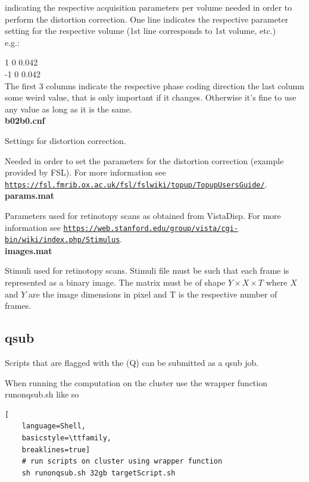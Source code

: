 \documentclass[12pt,a4paper]{scrartcl}
\begin{document}
\noindent indicating the respective acquisition parameters per volume needed in order to perform the distortion correction. One line indicates the respective parameter setting for the respective volume (1st line corresponds to 1st volume, etc.)\\

\noindent e.g.:

 1 0 0.042\\
 -1 0 0.042\\

The first 3 columns indicate the respective phase coding direction the last column some weird value, that is only important if it changes. Otherwise it's fine to use any value as long as it is the same.\\

\noindent\textbf{b02b0.cnf}

\noindent Settings for distortion correction.

Needed in order to set the parameters for the distortion correction (example provided by FSL). For more information see \href{https://fsl.fmrib.ox.ac.uk/fsl/fslwiki/topup/TopupUsersGuide/}{\nolinkurl{https://fsl.fmrib.ox.ac.uk/fsl/fslwiki/topup/TopupUsersGuide/}}.\\

\noindent\textbf{params.mat}

\noindent Parameters used for retinotopy scans as obtained from VistaDisp. For more information see \href{https://web.stanford.edu/group/vista/cgi-bin/wiki/index.php/Stimulus}{\nolinkurl{https://web.stanford.edu/group/vista/cgi-bin/wiki/index.php/Stimulus}}.\\

\noindent\textbf{images.mat}

\noindent Stimuli used for retinotopy scans. Stimuli file must be such that each frame is represented as a binary image. The matrix must be of shape $Y \times X \times T$ where $X$ and $Y$ are the image dimensions in pixel and T is the respective number of frames.

\subsection{qsub}
Scripts that are flagged with the (Q) can be submitted as a qsub job.

\noindent When running the computation on the cluster use the wrapper function runonqsub.sh like so
\begin{lstlisting}[
    language=Shell,
    basicstyle=\ttfamily,
    breaklines=true]
    # run scripts on cluster using wrapper function
    sh runonqsub.sh 32gb targetScript.sh
\end{lstlisting}
\end{document}

